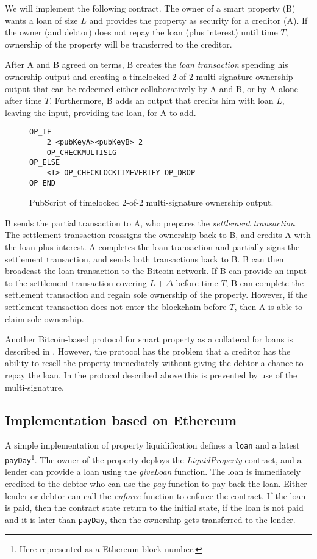 We will implement the following contract. The owner of a smart property (B) wants a loan of size $L$ and provides the property as security for a creditor (A). If the owner (and debtor) does not repay the loan (plus interest) until time $T$, ownership of the property will be transferred to the creditor.

After A and B agreed on terms, B creates the \emph{loan transaction} spending his ownership output and creating a timelocked 2-of-2 multi-signature ownership output that can be redeemed either collaboratively by A and B, or by A alone after time $T$. Furthermore, B adds an output that credits him with loan $L$, leaving the input, providing the loan, for A to add. 
\begin{figure}
\begin{lstlisting}
OP_IF 
    2 <pubKeyA><pubKeyB> 2
    OP_CHECKMULTISIG
OP_ELSE
    <T> OP_CHECKLOCKTIMEVERIFY OP_DROP
OP_END    
\end{lstlisting}
\caption{PubScript of timelocked 2-of-2 multi-signature ownership output.}
\end{figure}

B sends the partial transaction to A, who prepares the \emph{settlement transaction}. The settlement transaction reassigns the ownership back to B, and credits A with the loan plus interest. A completes the loan transaction and partially signs the settlement transaction, and sends both transactions back to B. B can then broadcast the loan transaction to the Bitcoin network. 
If B can provide an input to the settlement transaction covering $L+\Delta$ before time $T$, B can complete the settlement transaction and regain sole ownership of the property. However, if the settlement transaction does not enter the blockchain before $T$, then A is able to claim sole ownership.

Another Bitcoin-based protocol for smart property as a collateral for loans is described in \cite{smartproperty2011}. However, the protocol has the problem that a creditor has the ability to resell the property immediately without giving the debtor a chance to repay the loan. In the protocol described above this is prevented by use of the multi-signature. 

\subsection{Implementation based on Ethereum}

A simple implementation of property liquidification defines a \texttt{loan} and a latest \texttt{payDay}\footnote{Here represented as a Ethereum block number.}. The owner of the property deploys the \emph{LiquidProperty} contract, and a lender can provide a loan using the \emph{giveLoan} function. The loan is immediately credited to the debtor who can use the \emph{pay} function to pay back the loan. Either lender or debtor can call the \emph{enforce} function to enforce the contract. If the loan is paid, then the contract state return to the initial state, if the loan is not paid and it is later than \texttt{payDay}, then the ownership gets transferred to the lender.

